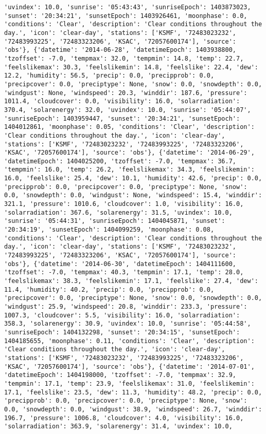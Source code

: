 \documentclass[
  letterpaper,
  DIV=11,
  numbers=noendperiod]{scrartcl}
\begin{document}
\begin{verbatim}
'uvindex': 10.0, 'sunrise': '05:43:43', 'sunriseEpoch': 1403873023, 'sunset': '20:34:21', 'sunsetEpoch': 1403926461, 'moonphase': 0.0, 'conditions': 'Clear', 'description': 'Clear conditions throughout the day.', 'icon': 'clear-day', 'stations': ['KSMF', '72483023232', '72483993225', '72483323206', 'KSAC', '72057600174'], 'source': 'obs'}, {'datetime': '2014-06-28', 'datetimeEpoch': 1403938800, 'tzoffset': -7.0, 'tempmax': 32.0, 'tempmin': 14.8, 'temp': 22.7, 'feelslikemax': 30.3, 'feelslikemin': 14.8, 'feelslike': 22.4, 'dew': 12.2, 'humidity': 56.5, 'precip': 0.0, 'precipprob': 0.0, 'precipcover': 0.0, 'preciptype': None, 'snow': 0.0, 'snowdepth': 0.0, 'windgust': None, 'windspeed': 20.3, 'winddir': 187.6, 'pressure': 1011.4, 'cloudcover': 0.0, 'visibility': 16.0, 'solarradiation': 370.4, 'solarenergy': 32.0, 'uvindex': 10.0, 'sunrise': '05:44:07', 'sunriseEpoch': 1403959447, 'sunset': '20:34:21', 'sunsetEpoch': 1404012861, 'moonphase': 0.05, 'conditions': 'Clear', 'description': 'Clear conditions throughout the day.', 'icon': 'clear-day', 'stations': ['KSMF', '72483023232', '72483993225', '72483323206', 'KSAC', '72057600174'], 'source': 'obs'}, {'datetime': '2014-06-29', 'datetimeEpoch': 1404025200, 'tzoffset': -7.0, 'tempmax': 36.7, 'tempmin': 16.0, 'temp': 26.2, 'feelslikemax': 34.3, 'feelslikemin': 16.0, 'feelslike': 25.4, 'dew': 10.1, 'humidity': 42.6, 'precip': 0.0, 'precipprob': 0.0, 'precipcover': 0.0, 'preciptype': None, 'snow': 0.0, 'snowdepth': 0.0, 'windgust': None, 'windspeed': 15.4, 'winddir': 321.1, 'pressure': 1010.6, 'cloudcover': 1.0, 'visibility': 16.0, 'solarradiation': 367.6, 'solarenergy': 31.5, 'uvindex': 10.0, 'sunrise': '05:44:31', 'sunriseEpoch': 1404045871, 'sunset': '20:34:19', 'sunsetEpoch': 1404099259, 'moonphase': 0.08, 'conditions': 'Clear', 'description': 'Clear conditions throughout the day.', 'icon': 'clear-day', 'stations': ['KSMF', '72483023232', '72483993225', '72483323206', 'KSAC', '72057600174'], 'source': 'obs'}, {'datetime': '2014-06-30', 'datetimeEpoch': 1404111600, 'tzoffset': -7.0, 'tempmax': 40.3, 'tempmin': 17.1, 'temp': 28.0, 'feelslikemax': 38.3, 'feelslikemin': 17.1, 'feelslike': 27.4, 'dew': 11.4, 'humidity': 40.2, 'precip': 0.0, 'precipprob': 0.0, 'precipcover': 0.0, 'preciptype': None, 'snow': 0.0, 'snowdepth': 0.0, 'windgust': 25.9, 'windspeed': 20.8, 'winddir': 233.3, 'pressure': 1007.3, 'cloudcover': 5.5, 'visibility': 16.0, 'solarradiation': 358.3, 'solarenergy': 30.9, 'uvindex': 10.0, 'sunrise': '05:44:58', 'sunriseEpoch': 1404132298, 'sunset': '20:34:15', 'sunsetEpoch': 1404185655, 'moonphase': 0.11, 'conditions': 'Clear', 'description': 'Clear conditions throughout the day.', 'icon': 'clear-day', 'stations': ['KSMF', '72483023232', '72483993225', '72483323206', 'KSAC', '72057600174'], 'source': 'obs'}, {'datetime': '2014-07-01', 'datetimeEpoch': 1404198000, 'tzoffset': -7.0, 'tempmax': 32.9, 'tempmin': 17.1, 'temp': 23.9, 'feelslikemax': 31.0, 'feelslikemin': 17.1, 'feelslike': 23.5, 'dew': 11.3, 'humidity': 48.2, 'precip': 0.0, 'precipprob': 0.0, 'precipcover': 0.0, 'preciptype': None, 'snow': 0.0, 'snowdepth': 0.0, 'windgust': 38.9, 'windspeed': 26.7, 'winddir': 196.7, 'pressure': 1006.8, 'cloudcover': 4.0, 'visibility': 16.0, 'solarradiation': 363.9, 'solarenergy': 31.4, 'uvindex': 10.0, 
\end{verbatim}
\end{document}
